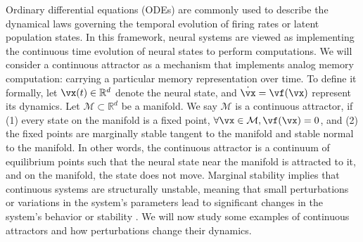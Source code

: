 \documentclass{article} %
\newcounter{ct}
\newcommand{\reals}{\mathbb{R}}
\newcommand{\manifold}{\mathcal{M}}
\theoremstyle{definition}
\theoremstyle{remark}
\renewcommand{\cite}{\citep}
\begin{document}
Ordinary differential equations (ODEs) are commonly used to describe the dynamical laws governing the temporal evolution of firing rates or latent population states\cite{vyas2020}.
In this framework, neural systems are viewed as implementing the continuous time evolution of neural states to perform computations.
We will consider a continuous attractor as a mechanism that implements analog memory computation: carrying a particular memory representation over time.
To define it formally, let \(\vx(t) \in \reals^d\) denote the neural state, and \(\dot{\vx} = \vf(\vx)\) represent its dynamics.
Let \(\manifold \subset \reals^d\) be a manifold.
We say \(\manifold\) is a continuous attractor, if (1) every state on the manifold is a fixed point, \(\forall \vx \in \manifold, \vf(\vx) = 0\), and (2) the fixed points are marginally stable tangent to the manifold and stable normal to the manifold.
In other words, the continuous attractor is a continuum of equilibrium points such that the neural state near the manifold is attracted to it, and on the manifold, the state does not move.
Marginal stability implies that continuous systems are structurally unstable, meaning that small perturbations or variations in the system's parameters lead to significant changes in the system's behavior or stability \citep{peixoto1959structural, palis2000structural, robbin1971structural, robinson1974structural}.
We will now study some examples of continuous attractors and how perturbations change their dynamics.

\end{document}
